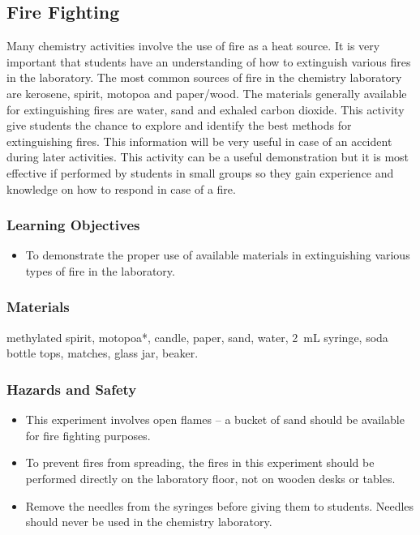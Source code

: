 \subsection{Fire Fighting}
Many chemistry activities involve the use of fire as a heat source. It is very important that students have an understanding of how to extinguish various fires in the laboratory. The most common sources of fire in the chemistry laboratory are kerosene, spirit, motopoa and paper/wood. The materials generally available for extinguishing fires are water, sand and exhaled carbon dioxide. This activity give students the chance to explore and identify the best methods for extinguishing fires. This information will be very useful in case of an accident during later activities. This activity can be a useful demonstration but it is most effective if performed by students in small groups so they gain experience and knowledge on how to respond in case of a fire.
\subsubsection*{Learning Objectives}
\begin{itemize}
\item{To demonstrate the proper use of available materials in extinguishing various types of fire in the laboratory.}
\end{itemize}

\subsubsection*{Materials}
methylated spirit, motopoa*, candle, paper, sand, water, 2~mL syringe, soda bottle tops, matches, glass jar, beaker.

\subsubsection*{Hazards and Safety}
\begin{itemize}
\item{This experiment involves open flames -- a bucket of sand should be available for fire fighting purposes.}
\item{To prevent fires from spreading, the fires in this experiment should be performed directly on the laboratory floor, not on wooden desks or tables.}
\item{Remove the needles from the syringes before giving them to students. Needles should never be used in the chemistry laboratory.}
\end{itemize}

